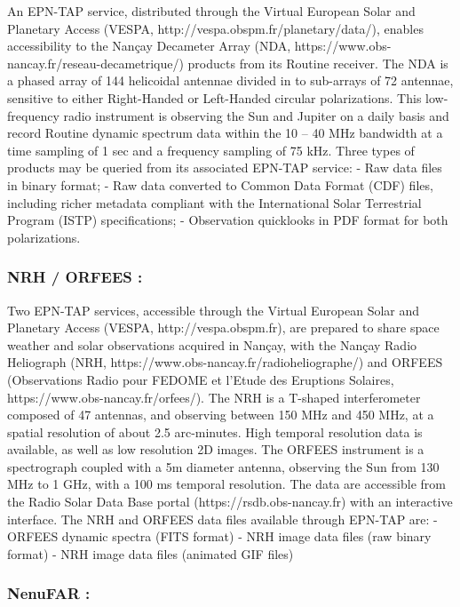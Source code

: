\documentclass[11pt,a4paper]{ivoa}
\begin{document}
An EPN-TAP service, distributed through the Virtual European Solar and Planetary Access (VESPA, http://vespa.obspm.fr/planetary/data/), enables accessibility to the Nançay Decameter Array (NDA, https://www.obs-nancay.fr/reseau-decametrique/) products from its Routine receiver. The NDA is a phased array of 144 helicoidal antennae divided in to sub-arrays of 72 antennae, sensitive to either Right-Handed or Left-Handed circular polarizations. This low-frequency radio instrument is observing the Sun and Jupiter on a daily basis and record Routine dynamic spectrum data within the 10 – 40 MHz bandwidth at a time sampling of 1 sec and a frequency sampling of 75 kHz. Three types of products may be queried from its associated EPN-TAP service:
- Raw data files in binary format;
- Raw data converted to Common Data Format (CDF) files, including richer metadata compliant with the International Solar Terrestrial Program (ISTP) specifications;
- Observation quicklooks in PDF format for both polarizations.


\subsubsection{NRH / ORFEES :}

Two EPN-TAP services, accessible through the Virtual European Solar and Planetary Access (VESPA, http://vespa.obspm.fr), are prepared to share space weather and solar observations acquired in Nançay, with the Nançay Radio Heliograph (NRH, https://www.obs-nancay.fr/radioheliographe/) and ORFEES (Observations Radio pour FEDOME et l'Etude des Eruptions Solaires, https://www.obs-nancay.fr/orfees/). The NRH is a T-shaped interferometer composed of 47 antennas, and observing between 150 MHz and 450 MHz, at a spatial resolution of about 2.5 arc-minutes. High temporal resolution data is available, as well as low resolution 2D images. The ORFEES instrument is a spectrograph coupled with a 5m diameter antenna, observing the Sun from 130 MHz to 1 GHz, with a 100 ms temporal resolution. The data are accessible from the Radio Solar Data Base portal (https://rsdb.obs-nancay.fr) with an interactive interface. The NRH and ORFEES data files available through EPN-TAP are:
- ORFEES dynamic spectra (FITS format)
- NRH image data files (raw binary format)
- NRH image data files (animated GIF files)


\subsubsection{NenuFAR :}
\end{document}
